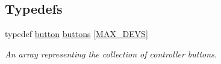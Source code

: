 \subsection*{Typedefs}
\begin{DoxyCompactItemize}
\item 
\hypertarget{group__common_ga0e4bedda1c8dd76f7771ff7a66ab7faf}{typedef \hyperlink{structbutton}{button} \hyperlink{group__common_ga0e4bedda1c8dd76f7771ff7a66ab7faf}{buttons} \mbox{[}\hyperlink{group__common_ga00cb63c6de93dec9cb1ea7136e5d8f0a}{M\-A\-X\-\_\-\-D\-E\-V\-S}\mbox{]}}\label{group__common_ga0e4bedda1c8dd76f7771ff7a66ab7faf}

\begin{DoxyCompactList}\small\item\em An array representing the collection of controller buttons. \end{DoxyCompactList}\end{DoxyCompactItemize}
